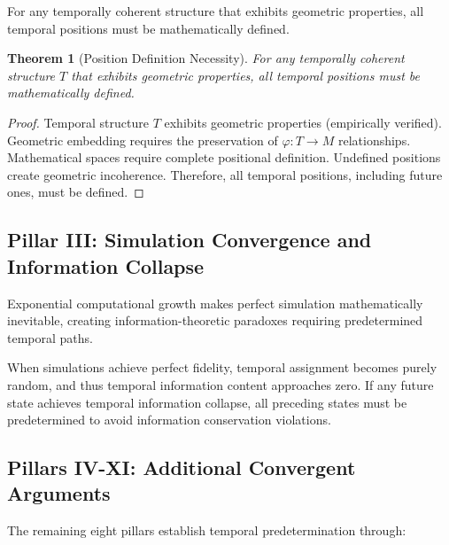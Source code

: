 \documentclass[12pt,a4paper]{article}
\newtheorem{theorem}{Theorem}
\begin{document}
For any temporally coherent structure that exhibits geometric properties, all temporal positions must be mathematically defined.

\begin{theorem}[Position Definition Necessity]
For any temporally coherent structure $T$ that exhibits geometric properties, all temporal positions must be mathematically defined.
\end{theorem}

\begin{proof}
Temporal structure $T$ exhibits geometric properties (empirically verified). Geometric embedding requires the preservation of $\varphi: T \to M$ relationships. Mathematical spaces require complete positional definition. Undefined positions create geometric incoherence. Therefore, all temporal positions, including future ones, must be defined.
\end{proof}

\subsection{Pillar III: Simulation Convergence and Information Collapse}

Exponential computational growth makes perfect simulation mathematically inevitable, creating information-theoretic paradoxes requiring predetermined temporal paths.

When simulations achieve perfect fidelity, temporal assignment becomes purely random, and thus temporal information content approaches zero. If any future state achieves temporal information collapse, all preceding states must be predetermined to avoid information conservation violations.

\subsection{Pillars IV-XI: Additional Convergent Arguments}

The remaining eight pillars establish temporal predetermination through:
\end{document}
